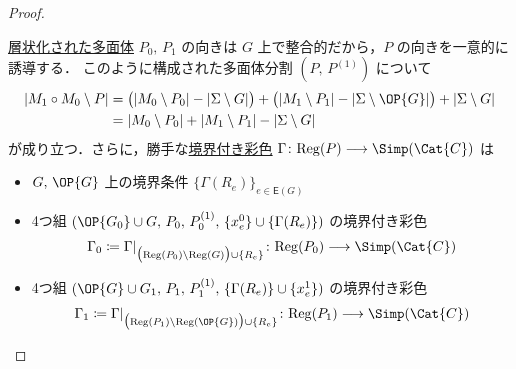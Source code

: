 \documentclass[TQFT_main]{subfiles}
\begin{document}
\begin{proof}
\begin{description}
    \end{description}
    \hyperref[def:polyhedron]{層状化された多面体} $P_0,\, P_1$ の向きは $G$ 上で整合的だから，$P$ の向きを一意的に誘導する．
    このように構成された多面体分割 $(P,\, P^{(1)})$ について
    \begin{align}
        \abs{M_1 \circ M_0 \setminus P} 
        &= \bigl(\abs{M_0 \setminus P_0} - \abs{\Sigma \setminus G}\bigr) + \bigl(\abs{M_1 \setminus P_1} -  \abs{\Sigma \setminus \OP{G}}\bigr) + \abs{\Sigma \setminus G} \\
        &= \abs{M_0 \setminus P_0}  + \abs{M_1 \setminus P_1}  - \abs{\Sigma \setminus G} \label{eq:number-of-balls}
    \end{align}
    が成り立つ．さらに，勝手な\hyperref[def:coloring-bdy]{境界付き彩色} $\Gamma \colon \mathrm{Reg} (P) \lto \Simp (\Cat{C})$ は
    \begin{itemize}
        \item $G,\, \OP{G}$ 上の境界条件 $\{\Gamma (R_e)\}_{e \in \mathsf{E}(G)}$
        \item 4つ組 $(\OP{G_0} \cup G,\, P_0,\, P_0^{(1)},\, \{x_e^0\} \cup \{\Gamma (R_e)\})$ の境界付き彩色
        \begin{align}
            \Gamma_0 \coloneqq \Gamma|_{\bigl( \mathrm{Reg} (P_0) \setminus \mathrm{Reg} (G) \bigr) \cup \{R_e\}} \colon \mathrm{Reg} (P_0) \lto\Simp (\Cat{C})
        \end{align}
        
        \item 4つ組 $(\OP{G} \cup G_1,\, P_1,\, P_1^{(1)},\, \{\Gamma (R_e)\} \cup \{x_e^1\})$ の境界付き彩色
        \begin{align}
            \Gamma_1 \coloneqq \Gamma|_{\bigl( \mathrm{Reg} (P_1) \setminus \mathrm{Reg} (\OP{G}) \bigr) \cup \{R_e\}} \colon \mathrm{Reg} (P_1) \lto\Simp (\Cat{C})
        \end{align}
        

\end{itemize}
\end{proof}
\end{document}
